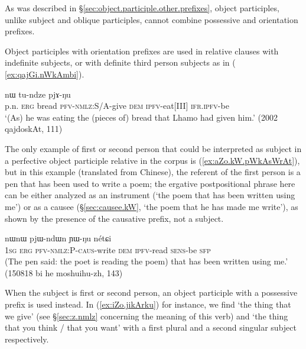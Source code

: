 As was described in §\ref{sec:object.participle.other.prefixes}, object participles, unlike subject and oblique participles, cannot combine possessive and orientation prefixes.

Object participles with orientation prefixes are used in relative clauses with indefinite subjects, or with definite third person subjects as in ( \ref{ex:qajGi.nWkAmbi}).  
 
\begin{exe}
\ex \label{ex:qajGi.nWkAmbi}
 nɯ tu-ndze pjɤ-ŋu \\
p.n. \textsc{erg} bread \textsc{pfv}-\textsc{nmlz}:S/A-give \textsc{dem} \textsc{ipfv}-eat[III] \textsc{ifr}.\textsc{ipfv}-be \\
\glt `(As) he was eating the (pieces of) bread that Lhamo had given him.' (2002 qajdoskAt, 111)
\end{exe}  

The only example of first or second person that could be interpreted as subject in a perfective object participle relative in the corpus is (\ref{ex:aZo.kW.pWkAsWrAt}), but in this example (translated from Chinese), the referent of the first person is a pen that has been used to write a poem; the ergative postpositional phrase  here can be either analyzed as an instrument (`the poem that has been written using me') or as a causee  (§\ref{sec:causee.kW}, `the poem that he has made me write'), as shown by the presence of the causative  prefix, not a subject.

\begin{exe}
\ex \label{ex:aZo.kW.pWkAsWrAt}
 nɯnɯ pjɯ-ndɯn ɲɯ-ŋu nétɕi \\
\textsc{1sg} \textsc{erg} \textsc{pfv}-\textsc{nmlz}:P-\textsc{caus}-write \textsc{dem} \textsc{ipfv}-read \textsc{sens}-be \textsc{sfp} \\
\glt (The pen said: the poet is reading the poem) that has been written using me.' (150818 bi he moshuihu-zh, 143)
\end{exe}  

When the subject is first or second person, an object participle with a possessive prefix  is used instead. In (\ref{ex:iZo.jikArku}) for instance, we find  `the thing that we give' (see §\ref{sec:z.nmlz} concerning the meaning of this verb) and  `the thing that you think / that you want' with a first plural and a second singular subject respectively.

